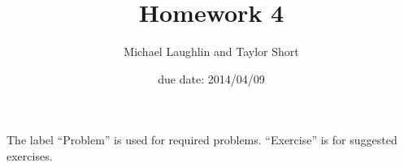 
         \newcommand\alg[1]{\ensuremath{\mathbf{#1}}}
         \newcommand{\<}{\ensuremath{\langle}}
         \renewcommand{\>}{\ensuremath{\rangle}}
         \newcommand\fld[1]{\ensuremath{\mathbb{#1}}}
         \newcommand\Z{\fld{Z}}
         \newcommand\GF{\ensuremath{\operatorname{GF}}}
         \author{Michael Laughlin and Taylor Short}
         \title{Homework 4}
         \date{due date: 2014/04/09}



\maketitle

\noindent The label ``Problem'' is used for required problems. ``Exercise''
is for suggested exercises.

